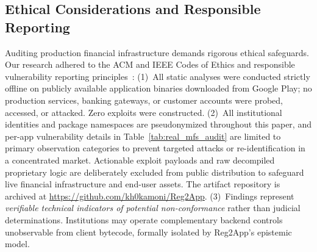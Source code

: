 \subsection{Ethical Considerations and Responsible Reporting}
\label{sec:case_study:ethics}

Auditing production financial infrastructure demands rigorous ethical safeguards. Our research adhered to the ACM and IEEE Codes of Ethics and responsible vulnerability reporting principles~\cite{cavusoglu_cvd, iso_29147_cvd}:
(1)~All static analyses were conducted strictly offline on publicly available application binaries downloaded from Google Play; no production services, banking gateways, or customer accounts were probed, accessed, or attacked. Zero exploits were constructed.
(2)~All institutional identities and package namespaces are pseudonymized throughout this paper, and per-app vulnerability details in Table~\ref{tab:real_mfs_audit} are limited to primary observation categories to prevent targeted attacks or re-identification in a concentrated market. Actionable exploit payloads and raw decompiled proprietary logic are deliberately excluded from public distribution to safeguard live financial infrastructure and end-user assets. The artifact repository is archived at \url{https://github.com/kh0kamoni/Reg2App}.
(3)~Findings represent \textit{verifiable technical indicators of potential non-conformance} rather than judicial determinations. Institutions may operate complementary backend controls unobservable from client bytecode, formally isolated by Reg2App's epistemic model.
